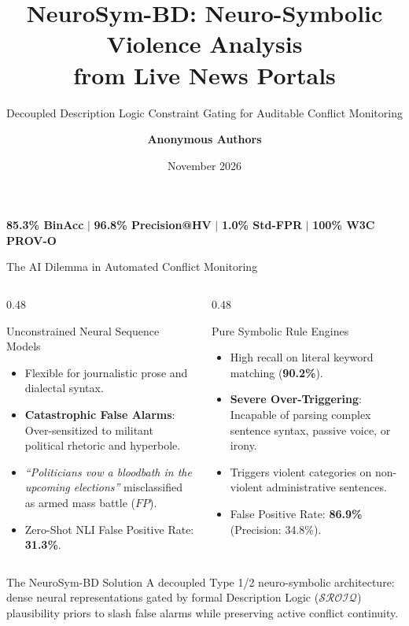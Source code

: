 \documentclass[aspectratio=169, 10pt]{beamer}
\title[\textbf{NeuroSym-BD}]{\textbf{NeuroSym-BD: Neuro-Symbolic Violence Analysis \\ from Live News Portals}}
\subtitle{Decoupled Description Logic Constraint Gating for Auditable Conflict Monitoring}
\author{\textbf{Anonymous Authors}}
\institute{Open-Source ML Research Initiative}
\date{November 2026}
\begin{document}
\begin{frame}
  \titlepage
  \begin{center}
    \footnotesize
    \textcolor{EmeraldGreen}{\textbf{85.3\% BinAcc}} \quad $\vert$ \quad
    \textcolor{NavyBlue}{\textbf{96.8\% Precision@HV}} \quad $\vert$ \quad
    \textcolor{RoseRed}{\textbf{1.0\% Std-FPR}} \quad $\vert$ \quad
    \textcolor{AmberYellow}{\textbf{100\% W3C PROV-O}}
  \end{center}
\end{frame}

\begin{frame}{The AI Dilemma in Automated Conflict Monitoring}
  \begin{columns}[T]
    \begin{column}{0.48\textwidth}
      \begin{block}{Unconstrained Neural Sequence Models}
        \begin{itemize}
          \item Flexible for journalistic prose and dialectal syntax.
          \item \textbf{Catastrophic False Alarms}: Over-sensitized to militant political rhetoric and hyperbole.
          \item \textit{``Politicians vow a bloodbath in the upcoming elections''} misclassified as armed mass battle ($FP$).
          \item Zero-Shot NLI False Positive Rate: \textbf{31.3\%}.
        \end{itemize}
      \end{block}
    \end{column}
    \begin{column}{0.48\textwidth}
      \begin{block}{Pure Symbolic Rule Engines}
        \begin{itemize}
          \item High recall on literal keyword matching (\textbf{90.2\%}).
          \item \textbf{Severe Over-Triggering}: Incapable of parsing complex sentence syntax, passive voice, or irony.
          \item Triggers violent categories on non-violent administrative sentences.
          \item False Positive Rate: \textbf{86.9\%} (Precision: 34.8\%).
        \end{itemize}
      \end{block}
    \end{column}
  \end{columns}
  \vspace{0.8em}
  \begin{alertblock}{The NeuroSym-BD Solution}
    A decoupled Type 1/2 neuro-symbolic architecture: dense neural representations gated by formal Description Logic ($\mathcal{SROIQ}$) plausibility priors to slash false alarms while preserving active conflict continuity.
  \end{alertblock}
\end{frame}
\end{document}
